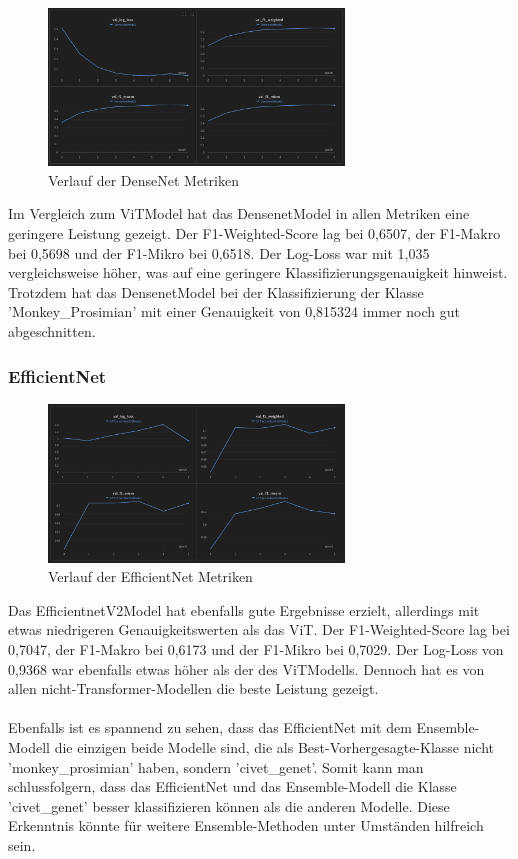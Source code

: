 \documentclass{article}
\begin{document}
\begin{figure}[!h]
    \centering
    \includegraphics[width=0.7\textwidth]{plots/DenseNet_wandb.png}
    \caption{\label{fig:wb_densenet}Verlauf der DenseNet Metriken}
\end{figure}

Im Vergleich zum ViTModel hat das DensenetModel in allen Metriken eine geringere Leistung gezeigt. Der F1-Weighted-Score lag bei 0,6507, der F1-Makro bei 0,5698 und der F1-Mikro bei 0,6518. Der Log-Loss war mit 1,035 vergleichsweise höher, was auf eine geringere Klassifizierungsgenauigkeit hinweist. Trotzdem hat das DensenetModel bei der Klassifizierung der Klasse 'Monkey\_Prosimian' mit einer Genauigkeit von 0,815324 immer noch gut abgeschnitten.

\subsubsection{EfficientNet}

\begin{figure}[!h]
    \centering
    \includegraphics[width=0.7\textwidth]{plots/EfficientNet_wandb.png}
    \caption{\label{fig:wb_efficient}Verlauf der EfficientNet Metriken}
\end{figure}

Das EfficientnetV2Model hat ebenfalls gute Ergebnisse erzielt, allerdings mit etwas niedrigeren Genauigkeitswerten als das ViT. Der F1-Weighted-Score lag bei 0,7047, der F1-Makro bei 0,6173 und der F1-Mikro bei 0,7029. Der Log-Loss von 0,9368 war ebenfalls etwas höher als der des ViTModells. Dennoch hat es von allen nicht-Transformer-Modellen die beste Leistung gezeigt.\\\\
Ebenfalls ist es spannend zu sehen, dass das EfficientNet mit dem Ensemble-Modell die einzigen beide Modelle sind, die als Best-Vorhergesagte-Klasse nicht 'monkey\_prosimian' haben, sondern 'civet\_genet'. Somit kann man schlussfolgern, dass das EfficientNet und das Ensemble-Modell die Klasse 'civet\_genet' besser klassifizieren können als die anderen Modelle. Diese Erkenntnis könnte für weitere Ensemble-Methoden unter Umständen hilfreich sein.
\end{document}
